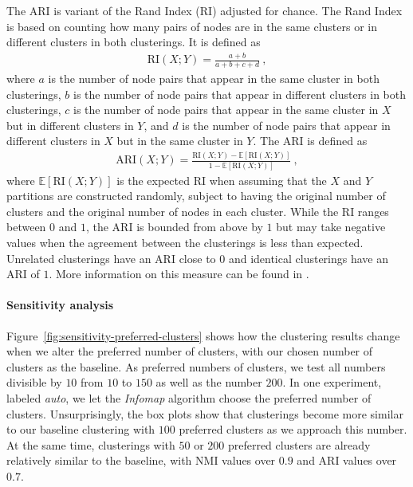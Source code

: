 \documentclass[utf8,sort&compress,numbers,square,table,hidelinks]{frontiers_suppmat} %
\begin{document}
The ARI is variant of the Rand Index (RI) adjusted for chance. 
The Rand Index is based on counting how many pairs of nodes are in the same clusters or in different clusters in both clusterings. 
It is defined as
\begin{align*}
	\text{RI}(X;Y) = \frac{a+b}{a+b+c+d}~,
\end{align*}
where $a$ is the number of node pairs that appear in the same cluster in both clusterings, 
$b$ is the number of node pairs that appear in different clusters in both clusterings, 
$c$ is the number of node pairs that appear in the same cluster in $X$ but in different clusters in $Y$, and
$d$ is the number of node pairs that appear in different clusters in $X$ but in the same cluster in $Y$. 
The ARI is defined as
\begin{align*}
	\text{ARI}(X;Y) = \frac{\text{RI}(X;Y) - \mathbb{E}[\text{RI}(X;Y)]}{1 - \mathbb{E}[\text{RI}(X;Y)]}~,
\end{align*}
where $\mathbb{E}[\text{RI}(X;Y)]$ is the expected RI when assuming that the $X$ and $Y$ partitions are constructed randomly, 
subject to having the original number of clusters and the original number of nodes in each cluster.
While the RI ranges between $0$ and $1$, the ARI is bounded from above by $1$ but may take negative values when the agreement between the clusterings is less than expected. 
Unrelated clusterings have an ARI close to $0$ and identical clusterings have an ARI of $1$. 
More information on this measure can be found in \cite{hubert1985}.

\vspace*{12pt}
\paragraph{Sensitivity analysis}

Figure~\ref{fig:sensitivity-preferred-clusters} shows how the clustering results change when we alter the preferred number of clusters, 
with our chosen number of clusters as the baseline. 
As preferred numbers of clusters, we test all numbers divisible by $10$ from $10$ to $150$ as well as the number $200$. 
In one experiment, labeled \emph{auto}, we let the \emph{Infomap} algorithm choose the preferred number of clusters.
Unsurprisingly, the box plots show that clusterings become more similar to our baseline clustering with $100$ preferred clusters as we approach this number. 
At the same time, clusterings with $50$ or $200$ preferred clusters are already relatively similar to the baseline, with NMI values over $0.9$ and ARI values over $0.7$.
\end{document}
